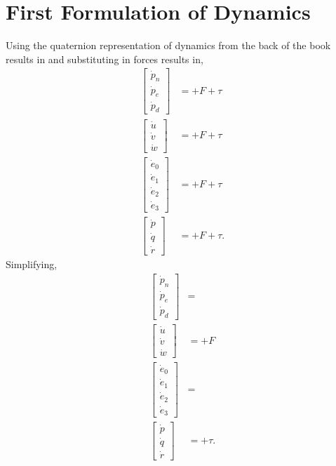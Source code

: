 \documentclass[11pt]{article}
\newcommand{\mathse}[1]{\begin{gather*}#1\end{gather*}}
\newcommand{\mat}[1]{\begin{bmatrix} #1 \end{bmatrix}}
\newcommand{\sinput}[1]{}
\begin{document}
\section{First Formulation of Dynamics}
Using the quaternion representation of dynamics from the back of the book results in and substituting in forces results in,
\begin{align*}
    \mat{\dot{p}_n\\ \dot{p}_e\\ \dot{p}_d} &= \sinput{M1}\sinput{x1} + \sinput{B1_F}F + \sinput{B1_tau}\tau\\
    \mat{\dot{u}\\ \dot{v}\\ \dot{w}} &= \sinput{M2}\sinput{x2} + \sinput{B2_F}F + \sinput{B1_tau}\tau\\
    \mat{\dot{e}_0\\ \dot{e}_1\\ \dot{e}_2\\ \dot{e}_3} &= \sinput{M3}\sinput{x3} + \sinput{B3_F}F + \sinput{B3_tau}\tau\\
    \mat{\dot{p}\\ \dot{q}\\ \dot{r}} &= \sinput{M4}\sinput{x4} + \sinput{B4_F}F + \sinput{B4_tau}\tau.
\end{align*}
Simplifying,
\begin{align*}
    \mat{\dot{p}_n\\ \dot{p}_e\\ \dot{p}_d} &= \sinput{M1}\sinput{x1}\\
    \mat{\dot{u}\\ \dot{v}\\ \dot{w}} &= \sinput{M2} + \sinput{B2_F}F\\
    \mat{\dot{e}_0\\ \dot{e}_1\\ \dot{e}_2\\ \dot{e}_3} &= \sinput{M3}\sinput{x3}\\
    \mat{\dot{p}\\ \dot{q}\\ \dot{r}} &= \sinput{M4} + \sinput{B4_tau}\tau.
\end{align*}
\end{document}
